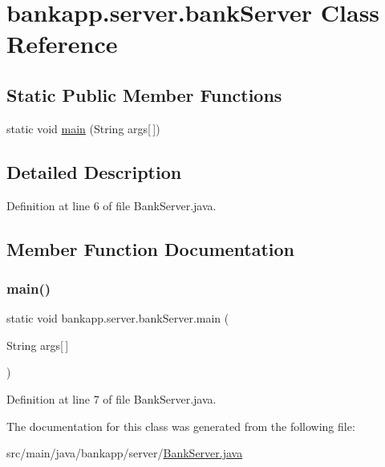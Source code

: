 \hypertarget{classbankapp_1_1server_1_1bank_server}{}\section{bankapp.\+server.\+bank\+Server Class Reference}
\label{classbankapp_1_1server_1_1bank_server}
\subsection*{Static Public Member Functions}
\begin{DoxyCompactItemize}
\item 
static void \hyperlink{classbankapp_1_1server_1_1bank_server_aca6d24bb05576a3668a4421453785f90}{main} (String args\mbox{[}$\,$\mbox{]})
\end{DoxyCompactItemize}


\subsection{Detailed Description}


Definition at line 6 of file Bank\+Server.\+java.



\subsection{Member Function Documentation}
\mbox{\label{classbankapp_1_1server_1_1bank_server_aca6d24bb05576a3668a4421453785f90}} 
\subsubsection{\texorpdfstring{main()}{main()}}
{\footnotesize\ttfamily static void bankapp.\+server.\+bank\+Server.\+main (\begin{DoxyParamCaption}\item[{String}]{args\mbox{[}$\,$\mbox{]} }\end{DoxyParamCaption})\hspace{0.3cm}{\ttfamily [static]}}



Definition at line 7 of file Bank\+Server.\+java.



The documentation for this class was generated from the following file\+:\begin{DoxyCompactItemize}
\item 
src/main/java/bankapp/server/\hyperlink{_bank_server_8java}{Bank\+Server.\+java}\end{DoxyCompactItemize}
